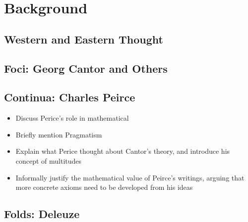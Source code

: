 \chapter{Background}
\label{ch:background}

\section{Western and Eastern Thought}

\section{Foci: Georg Cantor and Others}

\section{Continua: Charles Peirce}

\begin{itemize}
  \item Discuss Perice's role in mathematical
  \item Briefly mention Pragmatism
  \item Explain what Perice thought about Cantor's theory, and introduce his concept of multitudes
  \item Informally justify the mathematical value of Peirce's writings, arguing that more concrete axioms need to be developed
        from his ideas
\end{itemize}

\section{Folds: Deleuze}
